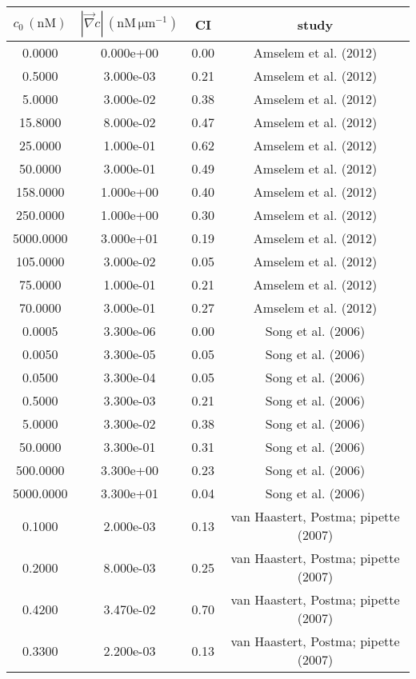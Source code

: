 \begin{table}[ht]
	\centering
		\begin{tabular}{|c|c|c|c|}
			\hline
			$c_0\,(\mathrm{nM})$ & $|\vec{\nabla}c|\, (\mathrm{nM\,\mu m^{-1}})$ & CI & study \\
			\hline\hline
				 0.0000 & 0.000e+00 & 0.00 & Amselem et al. (2012) \\
				 0.5000 & 3.000e-03 & 0.21 & Amselem et al. (2012) \\
				 5.0000 & 3.000e-02 & 0.38 & Amselem et al. (2012) \\
				15.8000 & 8.000e-02 & 0.47 & Amselem et al. (2012) \\
				25.0000 & 1.000e-01 & 0.62 & Amselem et al. (2012) \\
				50.0000 & 3.000e-01 & 0.49 & Amselem et al. (2012) \\
			 158.0000 & 1.000e+00 & 0.40 & Amselem et al. (2012) \\
			 250.0000 & 1.000e+00 & 0.30 & Amselem et al. (2012) \\
			5000.0000 & 3.000e+01 & 0.19 & Amselem et al. (2012) \\
			 105.0000 & 3.000e-02 & 0.05 & Amselem et al. (2012) \\
				75.0000 & 1.000e-01 & 0.21 & Amselem et al. (2012) \\
				70.0000 & 3.000e-01 & 0.27 & Amselem et al. (2012) \\
				 0.0005 & 3.300e-06 & 0.00 & Song et al. (2006) \\
				 0.0050 & 3.300e-05 & 0.05 & Song et al. (2006) \\
				 0.0500 & 3.300e-04 & 0.05 & Song et al. (2006) \\
				 0.5000 & 3.300e-03 & 0.21 & Song et al. (2006) \\
				 5.0000 & 3.300e-02 & 0.38 & Song et al. (2006) \\
				50.0000 & 3.300e-01 & 0.31 & Song et al. (2006) \\
			 500.0000 & 3.300e+00 & 0.23 & Song et al. (2006) \\
			5000.0000 & 3.300e+01 & 0.04 & Song et al. (2006) \\
				 0.1000 & 2.000e-03 & 0.13 & van Haastert, Postma; pipette (2007) \\
				 0.2000 & 8.000e-03 & 0.25 & van Haastert, Postma; pipette (2007) \\
				 0.4200 & 3.470e-02 & 0.70 & van Haastert, Postma; pipette (2007) \\
				 0.3300 & 2.200e-03 & 0.13 & van Haastert, Postma; pipette (2007) \\

\end{tabular}
\end{table}
